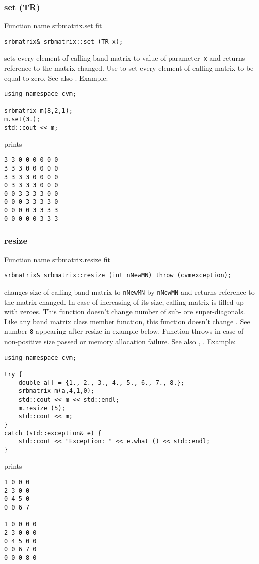 \subsubsection{set (TR)}
Function%
\pdfdest name {srbmatrix.set} fit
\begin{verbatim}
srbmatrix& srbmatrix::set (TR x);
\end{verbatim}
sets every element of  calling band matrix to  value of
parameter~\verb"x" and returns  reference to
the matrix changed.
Use  to set every element
of  calling matrix to be equal to zero.
See also .
Example:
\begin{Verbatim}
using namespace cvm;

srbmatrix m(8,2,1);
m.set(3.);
std::cout << m;
\end{Verbatim}
prints
\begin{Verbatim}
3 3 0 0 0 0 0 0
3 3 3 0 0 0 0 0
3 3 3 3 0 0 0 0
0 3 3 3 3 0 0 0
0 0 3 3 3 3 0 0
0 0 0 3 3 3 3 0
0 0 0 0 3 3 3 3
0 0 0 0 0 3 3 3
\end{Verbatim}
\newpage



\subsubsection{resize}
Function%
\pdfdest name {srbmatrix.resize} fit
\begin{verbatim}
srbmatrix& srbmatrix::resize (int nNewMN) throw (cvmexception);
\end{verbatim}
changes  size of  calling band matrix to \verb"nNewMN" by \verb"nNewMN"
and returns  reference to
the matrix changed. In case of increasing of its size, calling matrix
is filled up with zeroes. This function doesn't change
 number of sub- ore super-diagonals. Like any band matrix 
class member function, this function doesn't change 
. 
See number \verb"8" appearing after
resize in example below.
Function throws  
in case of non-positive size passed or memory allocation failure.
See also ,
.
Example:
\begin{Verbatim}
using namespace cvm;

try {
    double a[] = {1., 2., 3., 4., 5., 6., 7., 8.};
    srbmatrix m(a,4,1,0);
    std::cout << m << std::endl;
    m.resize (5);
    std::cout << m;
}
catch (std::exception& e) {
    std::cout << "Exception: " << e.what () << std::endl;
}
\end{Verbatim}
prints
\begin{Verbatim}
1 0 0 0
2 3 0 0
0 4 5 0
0 0 6 7

1 0 0 0 0
2 3 0 0 0
0 4 5 0 0
0 0 6 7 0
0 0 0 8 0
\end{Verbatim}
\newpage





